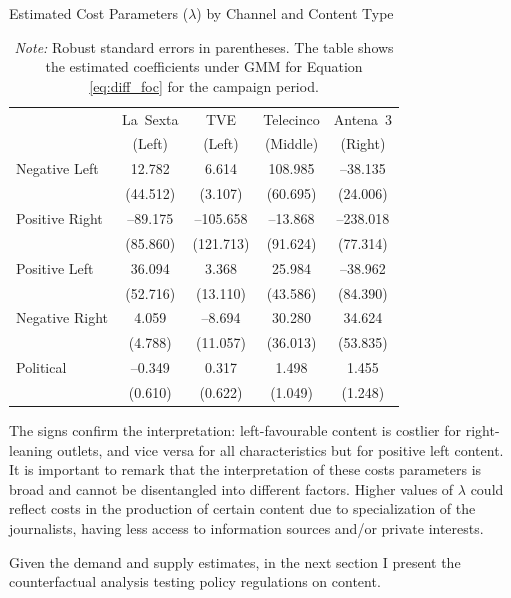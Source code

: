 \documentclass[12pt]{article}
\begin{document}
\begin{table}[!htbp]
	\caption{Estimated Cost Parameters ($\lambda$) by Channel and Content Type}
	\label{table:costs}
	\centering\small
	\begin{tabular}{lcccc}
		\toprule
		& La~Sexta & TVE & Telecinco & Antena~3 \\
	& 	\scriptsize{(Left)} & \scriptsize{(Left)} & \scriptsize{(Middle)}& \scriptsize(Right) \\
		\midrule
		Negative Left   
		& 12.782   &  6.614   & 108.985   & --38.135  \\
		& (44.512) & (3.107)  & (60.695)  & (24.006)  \\
				\midrule
		Positive Right  
		& --89.175 & --105.658 & --13.868  & --238.018 \\
		& (85.860) & (121.713) & (91.624)  & (77.314)  \\
		\midrule
		Positive Left   
		& 36.094   &  3.368   &  25.984   & --38.962  \\
		& (52.716) & (13.110) & (43.586)  & (84.390)  \\
				\midrule
		Negative Right  
		&  4.059   & --8.694  &  30.280   &  34.624   \\
		& (4.788)  & (11.057) & (36.013)  & (53.835)  \\
		\midrule
		Political 
		& --0.349  &  0.317   &   1.498   &   1.455   \\
		& (0.610)  & (0.622)  &  (1.049)  &  (1.248)  \\
		\bottomrule
	\end{tabular}
	\vspace{0.5em}
	\caption*{\scriptsize\emph{Note:} Robust standard errors in parentheses. The table shows the estimated coefficients under GMM for Equation \ref{eq:diff_foc} for the campaign period.}
\end{table}



The signs confirm the interpretation: left-favourable content is costlier for right-leaning outlets, and vice versa for all characteristics but for positive left content. It is important to remark that the interpretation of these costs parameters is broad and cannot be disentangled into different factors. Higher values of $\lambda$ could reflect costs in the production of certain content due to specialization of the journalists, having less access to information sources and/or private interests. 


Given the demand and supply estimates, in the next section I present the counterfactual analysis testing policy regulations on content. 
\end{document}
